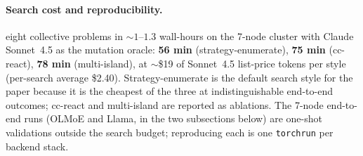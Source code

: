 \paragraph{Search cost and reproducibility.}
eight collective problems in $\sim$$1$--$1.3$ wall-hours on the
7-node cluster with Claude Sonnet~4.5 as the mutation oracle:
\textbf{56 min} (strategy-enumerate), \textbf{75 min} (cc-react),
\textbf{78 min} (multi-island), at $\sim$\$19 of Sonnet~4.5
list-price tokens per style (per-search average \$2.40).
Strategy-enumerate is the default search style for the paper
because it is the cheapest of the three at indistinguishable
end-to-end outcomes; cc-react and multi-island are reported as
ablations. The 7-node end-to-end runs (OLMoE and Llama, in the
two subsections below) are one-shot validations outside the search
budget; reproducing each is one \texttt{torchrun} per backend stack.



